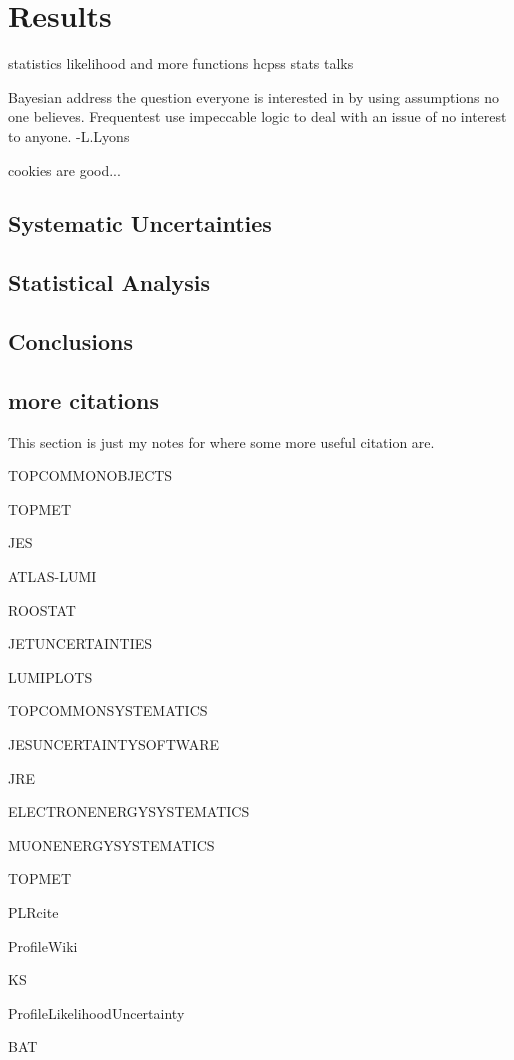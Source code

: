 \chapter{Results}
\label{SECTION-RESULTS}

statistics likelihood and more functions hcpss stats talks

Bayesian address the question everyone is interested in by using assumptions no one believes. Frequentest use impeccable logic to deal with an issue of no interest to anyone. -L.Lyons

cookies are good...

\section{Systematic Uncertainties}

\section{Statistical Analysis}

\section{Conclusions}

\section{more citations}

This section is just my notes for where some more useful citation are. 

TOPCOMMONOBJECTS~\cite{TOPCOMMONOBJECTS}

TOPMET~\cite{TOPMET}

JES~\cite{JES}~\cite{JESnew}

ATLAS-LUMI~\cite{ATLAS-LUMI}

ROOSTAT~\cite{ROOSTAT}

JETUNCERTAINTIES~\cite{JETUNCERTAINTIES}

LUMIPLOTS~\cite{LUMIPLOTS}

TOPCOMMONSYSTEMATICS~\cite{TOPCOMMONSYSTEMATICS}

JESUNCERTAINTYSOFTWARE~\cite{JESUNCERTAINTYSOFTWARE}

JRE~\cite{JRE}

ELECTRONENERGYSYSTEMATICS~\cite{ELECTRONENERGYSYSTEMATICS}

MUONENERGYSYSTEMATICS~\cite{MUONENERGYSYSTEMATICS}

TOPMET~\cite{TOPMET}

PLRcite~\cite{PLRcite}

ProfileWiki~\cite{ProfileWiki}

KS~\cite{KS}

ProfileLikelihoodUncertainty~\cite{ProfileLikelihoodUncertainty}

BAT~\cite{BAT}
